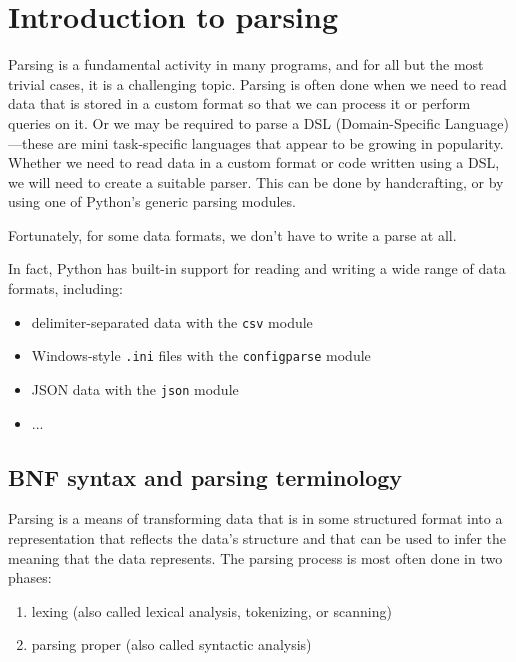 
\chapter{Introduction to parsing}

Parsing is a fundamental activity in many programs, and for all but the most trivial cases, it is a challenging topic.
Parsing is often done when we need to read data that is stored in a custom format so that we can process it or perform queries on it.
Or we may be required to parse a DSL (Domain-Specific Language)—these are mini task-specific languages that appear to be growing in popularity.
Whether we need to read data in a custom format or code written using a DSL, we will need to create a suitable parser.
This can be done by handcrafting, or by using one of Python’s generic parsing modules.



Fortunately, for some data formats, we don't have to write a parse at all.


In fact, Python has built-in support for reading and writing a wide range of data formats, including:
\begin{itemize}
\item delimiter-separated data with the \verb|csv| module
\item Windows-style \verb|.ini| files with the \verb|configparse| module
\item JSON data with the \verb|json| module
\item ... 
\end{itemize}






\section{BNF syntax and parsing terminology}

Parsing is a means of transforming data that is in some structured format into a representation that reflects the data's structure and that can be used to infer the meaning that the data represents.
The parsing process is most often done in two phases:
\begin{enumerate}
\item lexing (also called lexical analysis, tokenizing, or scanning)
\item parsing proper (also called syntactic analysis)
\end{enumerate}


